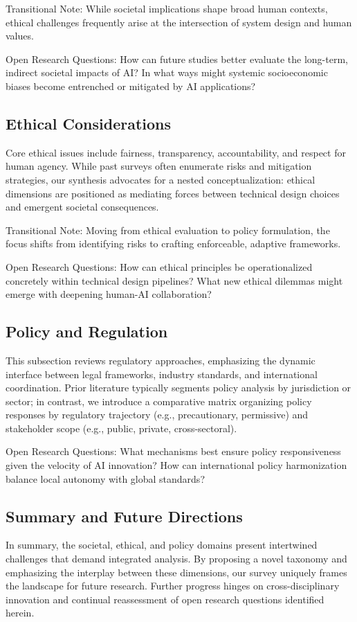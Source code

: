\documentclass[sigconf]{acmart}
\begin{document}
Transitional Note: While societal implications shape broad human contexts, ethical challenges frequently arise at the intersection of system design and human values.

Open Research Questions: How can future studies better evaluate the long-term, indirect societal impacts of AI? In what ways might systemic socioeconomic biases become entrenched or mitigated by AI applications?

\subsection{Ethical Considerations}
Core ethical issues include fairness, transparency, accountability, and respect for human agency. While past surveys often enumerate risks and mitigation strategies, our synthesis advocates for a nested conceptualization: ethical dimensions are positioned as mediating forces between technical design choices and emergent societal consequences.

Transitional Note: Moving from ethical evaluation to policy formulation, the focus shifts from identifying risks to crafting enforceable, adaptive frameworks.

Open Research Questions: How can ethical principles be operationalized concretely within technical design pipelines? What new ethical dilemmas might emerge with deepening human-AI collaboration?

\subsection{Policy and Regulation}
This subsection reviews regulatory approaches, emphasizing the dynamic interface between legal frameworks, industry standards, and international coordination. Prior literature typically segments policy analysis by jurisdiction or sector; in contrast, we introduce a comparative matrix organizing policy responses by regulatory trajectory (e.g., precautionary, permissive) and stakeholder scope (e.g., public, private, cross-sectoral).

Open Research Questions: What mechanisms best ensure policy responsiveness given the velocity of AI innovation? How can international policy harmonization balance local autonomy with global standards?

\subsection{Summary and Future Directions}
In summary, the societal, ethical, and policy domains present intertwined challenges that demand integrated analysis. By proposing a novel taxonomy and emphasizing the interplay between these dimensions, our survey uniquely frames the landscape for future research. Further progress hinges on cross-disciplinary innovation and continual reassessment of open research questions identified herein.
\end{document}
